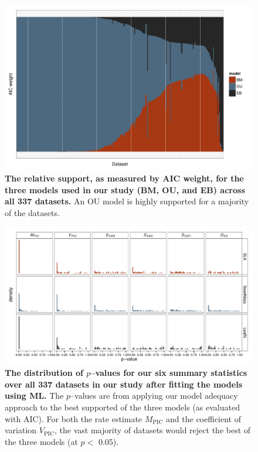 \documentclass[a4paper,12pt]{article}
\begin{document}
\begin{figure}[p]
  \centering
  \includegraphics[angle=90, origin=c, scale=0.8]{figs/aic-support}
  \caption{\textbf{The relative support, as measured by AIC weight, for the three models used in our study (BM, OU, and EB) across all 337 datasets.} An OU model is highly supported for a majority of the datasets.}
  \label{fig:aic-support}
\end{figure}

\begin{figure}[p]
  \centering
  \includegraphics[angle=90, origin=c, scale=0.85]{figs/pval-hist-ml}
  \caption{\textbf{The distribution of $p$--values for our six summary statistics over all 337 datasets in our study after fitting the models using ML.} The $p$--values are from applying our model adequacy approach to the best supported of the three models (as evaluated with AIC). For both the rate estimate $M_{\text{PIC}}$ and the coefficient of variation $V_{\text{PIC}}$, the vast majority of datasets would reject the best of the three models (at $p<$ 0.05).}
  \label{fig:pvalues}
\end{figure}
\end{document}
